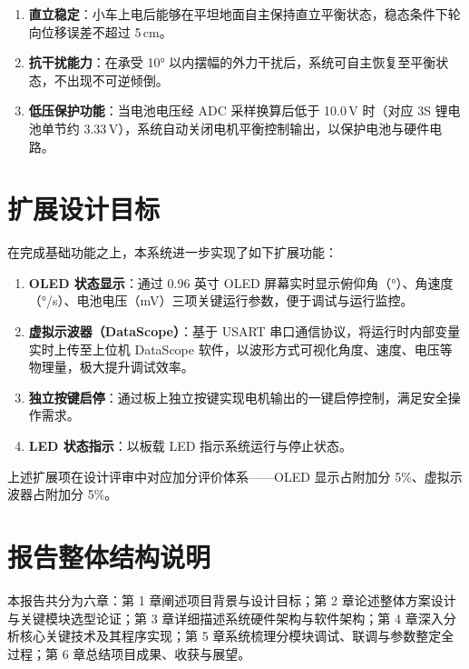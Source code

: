 \documentclass[12pt,a4paper,UTF8]{ctexrep}
\begin{document}
\begin{enumerate}
  \item \textbf{直立稳定}：小车上电后能够在平坦地面自主保持直立平衡状态，稳态条件下轮向位移误差不超过 5\,cm。
  \item \textbf{抗干扰能力}：在承受 10° 以内摆幅的外力干扰后，系统可自主恢复至平衡状态，不出现不可逆倾倒。
  \item \textbf{低压保护功能}：当电池电压经 ADC 采样换算后低于 10.0\,V 时（对应 3S 锂电池单节约 3.33\,V），系统自动关闭电机平衡控制输出，以保护电池与硬件电路。
\end{enumerate}

\section{扩展设计目标}

在完成基础功能之上，本系统进一步实现了如下扩展功能：

\begin{enumerate}
  \item \textbf{OLED 状态显示}：通过 0.96 英寸 OLED 屏幕实时显示俯仰角（°）、角速度（°/s）、电池电压（mV）三项关键运行参数，便于调试与运行监控。
  \item \textbf{虚拟示波器（DataScope）}：基于 USART 串口通信协议，将运行时内部变量实时上传至上位机 DataScope 软件，以波形方式可视化角度、速度、电压等物理量，极大提升调试效率。
  \item \textbf{独立按键启停}：通过板上独立按键实现电机输出的一键启停控制，满足安全操作需求。
  \item \textbf{LED 状态指示}：以板载 LED 指示系统运行与停止状态。
\end{enumerate}

上述扩展项在设计评审中对应加分评价体系——OLED 显示占附加分 5\%、虚拟示波器占附加分 5\%。

\section{报告整体结构说明}

本报告共分为六章：第 1 章阐述项目背景与设计目标；第 2 章论述整体方案设计与关键模块选型论证；第 3 章详细描述系统硬件架构与软件架构；第 4 章深入分析核心关键技术及其程序实现；第 5 章系统梳理分模块调试、联调与参数整定全过程；第 6 章总结项目成果、收获与展望。

\end{document}
